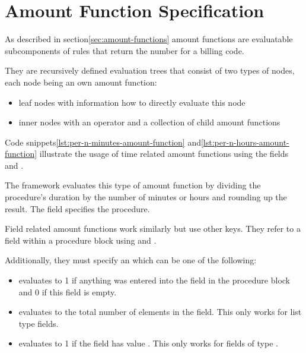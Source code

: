 \section{Amount Function Specification}\label{sec:amount-function-specification}


As described in section\ref{sec:amount-functions} amount functions are evaluatable subcomponents of rules that return
the number for a billing code.

They are recursively defined evaluation trees that consist of two types of nodes, each node being an own amount function:
\begin{itemize}
    \item leaf nodes with information how to directly evaluate this node
    \item inner nodes with an operator and a collection of child amount functions
\end{itemize}

Code snippets\ref{lst:per-n-minutes-amount-function} and\ref{lst:per-n-hours-amount-function} illustrate the usage of time related
amount functions using the fields and .





The framework evaluates this type of amount function by dividing the procedure's duration by the number of minutes or hours and rounding up the result.
The  field specifies the procedure.

Field related amount functions work similarly but use other keys.
They refer to a field within a procedure block using  and .

Additionally, they must specify an  which can be one of the following:

\begin{itemize}
    \item {} evaluates to 1 if anything was entered into the field in the procedure block and 0 if this field is empty.
    \item {} evaluates to the total number of elements in the field.
    This only works for list type fields.
    \item {} evaluates to 1 if the field has value .
    This only works for fields of type .
\end{itemize}

